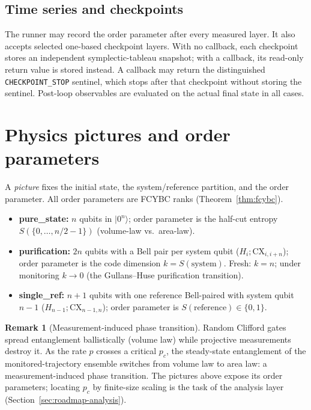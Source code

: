 \documentclass[11pt]{article}
\theoremstyle{definition}
\newtheorem{remark}[definition]{Remark}
\theoremstyle{plain}
\newcommand{\ket}[1]{\lvert #1\rangle}
\begin{document}
\subsection{Time series and checkpoints}
The runner may record the order parameter after every measured layer. It also
accepts selected one-based checkpoint layers. With no callback, each checkpoint
stores an independent symplectic-tableau snapshot; with a callback, its
read-only return value is stored instead. A callback may return the distinguished
\texttt{CHECKPOINT\_STOP} sentinel, which stops after that checkpoint without
storing the sentinel. Post-loop observables are evaluated on the actual final
state in all cases.

\section{Physics pictures and order parameters}
\label{sec:pictures}

A \emph{picture} fixes the initial state, the system/reference partition, and
the order parameter. All order parameters are FCYBC ranks
(Theorem~\ref{thm:fcybc}).
\begin{itemize}[leftmargin=1.5em]
\item \textbf{pure\_state:} $n$ qubits in $\ket{0^n}$; order parameter is the
  half-cut entropy $S(\{0,\dots,n/2-1\})$ (volume-law vs.\ area-law).
\item \textbf{purification:} $2n$ qubits with a Bell pair per system qubit
  ($H_i;\mathrm{CX}_{i,i+n}$); order parameter is the code dimension
  $k=S(\text{system})$. Fresh: $k=n$; under monitoring $k\to0$ (the Gullans--Huse
  purification transition).
\item \textbf{single\_ref:} $n+1$ qubits with one reference Bell-paired with
  system qubit $n-1$ ($H_{n-1};\mathrm{CX}_{n-1,n}$); order parameter is
  $S(\text{reference})\in\{0,1\}$.
\end{itemize}
\begin{remark}[Measurement-induced phase transition]
Random Clifford gates spread entanglement ballistically (volume law) while
projective measurements destroy it. As the rate $p$ crosses a critical $p_c$,
the steady-state entanglement of the monitored-trajectory ensemble switches from
volume law to area law: a measurement-induced phase transition. The pictures
above expose its order parameters; locating $p_c$ by finite-size scaling is the
task of the analysis layer (Section~\ref{sec:roadmap-analysis}).
\end{remark}
\end{document}
